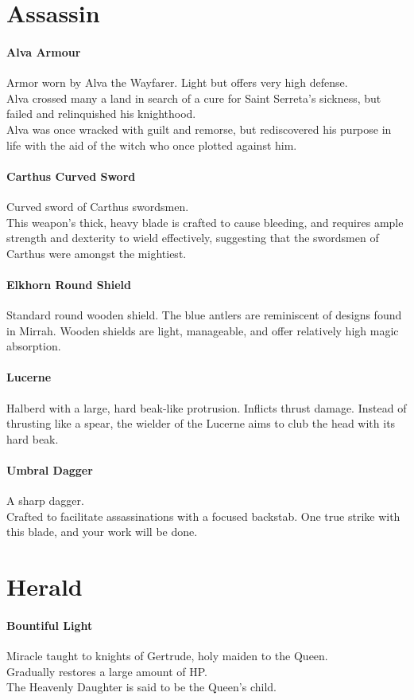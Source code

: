 \documentclass[twocolumn,a4paper]{article}
\begin{document}
\section*{Assassin}
\paragraph{Alva Armour}
Armor worn by Alva the Wayfarer. Light but offers very high defense.\\
Alva crossed many a land in search of a cure for Saint Serreta's sickness, but failed and relinquished his knighthood.\\
Alva was once wracked with guilt and remorse, but rediscovered his purpose in life with the aid of the witch who once plotted against him.
\paragraph{Carthus Curved Sword}
Curved sword of Carthus swordsmen.\\
This weapon's thick, heavy blade is crafted to cause bleeding, and requires ample strength and dexterity to wield effectively, suggesting that the swordsmen of Carthus were amongst the mightiest.
\paragraph{Elkhorn Round Shield}
Standard round wooden shield. The blue antlers are reminiscent of designs found in Mirrah.
Wooden shields are light, manageable, and offer relatively high magic absorption.
\paragraph{Lucerne}
Halberd with a large, hard beak-like protrusion. Inflicts thrust damage. Instead of thrusting like a spear, the wielder of the Lucerne aims to club the head with its hard beak.
\paragraph{Umbral Dagger}
A sharp dagger.\\
Crafted to facilitate assassinations with a focused backstab. One true strike with this blade, and your work will be done.
\section*{Herald}
\paragraph{Bountiful Light}
Miracle taught to knights of Gertrude, holy maiden to the Queen.\\
Gradually restores a large amount of HP.\\
The Heavenly Daughter is said to be the Queen's child.
\end{document}
